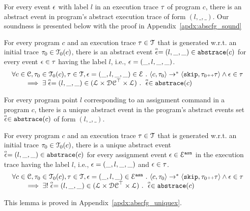    For every event $\mathtt{\epsilon}$ with label $l$ in an execution trace $\mathtt{\tau}$ of program $c$, 
   there is an abstract event in program's abstract execution trace of form $(l, \_, \_)$.  Our soundness is presented below
   with the proof in Appendix~\ref{apdx:abscfg_sound}
   \begin{lem}
     \label{lem:abscfg_sound}
     For every program $c$ and
     an execution trace $\mathtt{\tau} \in \mathcal{T}$ that is generated w.r.t.
     an initial trace  $\mathtt{\tau}_0 \in \mathcal{T}_0(c)$,
     there is an abstract event $\stackrel{\scriptscriptstyle{\alpha}}{\mathtt{\epsilon}{}} = (l, \_, \_) \in \mathtt{abs}{\mathtt{trace}}(c)$ 
     for every event $\mathtt{\epsilon} \in \mathtt{\tau}$ having the label $l$, i.e., $\mathtt{\epsilon} = (\_, l, \_, \_)$.
   \[
     \begin{array}{l}
       \forall c \in \mathcal{C}, \mathtt{\tau}_0 \in \mathcal{T}_0(c), \mathtt{\tau} \in \mathcal{T} ,  \mathtt{\epsilon} = (\_, l, \_, \_) \in \mathcal{E} ~.~
   \langle {c}, \mathtt{\tau}_0 \rangle \to^{*} \langle \mathtt{skip}, \mathtt{\tau}_0 {\scriptscriptstyle ++} \mathtt{\tau} \rangle 
   \land \mathtt{\epsilon} \in \mathtt{\tau} 
   \\
   \qquad \implies \exists \stackrel{\scriptscriptstyle{\alpha}}{\mathtt{\epsilon}{}} = (l, \_, \_) \in (\mathcal{L}\times \mathcal{DC}^{\top} \times \mathcal{L}) ~.~ 
   \stackrel{\scriptscriptstyle{\alpha}}{\mathtt{\epsilon}{}} \in \mathtt{abs}{\mathtt{trace}}(c)
   \end{array}
   \]
   \end{lem}

For every program point $l$ corresponding to an assignment command in a program $c$,
there is a unique abstract event in the program's abstract events set $\stackrel{\scriptscriptstyle{\alpha}}{\mathtt{\epsilon}{}} \in \mathtt{abs}{\mathtt{trace}}(c)$ of form $(l, \_, \_)$. 
\begin{lem}
  \label{lem:abscfg_uniquex}
  For every program $c$ and
  an execution trace $\mathtt{\tau} \in \mathcal{T}$ that is generated w.r.t.
  an initial trace  $\mathtt{\tau}_0 \in \mathcal{T}_0(c)$,
  there is a unique abstract event $\stackrel{\scriptscriptstyle{\alpha}}{\mathtt{\epsilon}{}} = (l, \_, \_) \in \mathtt{abs}{\mathtt{trace}}(c)$ 
  for every assignment event $\mathtt{\epsilon} \in \mathcal{E}^{\mathtt{{asn}}}$ in the
  execution trace having the label $l$, i.e., $\mathtt{\epsilon} = (\_, l, \_, \_)$ and  $\mathtt{\epsilon} \in \mathtt{\tau}$.
%
\[
  \begin{array}{l}
    \forall c \in \mathcal{C}, \mathtt{\tau}_0 \in \mathcal{T}_0(c), \mathtt{\tau} \in \mathcal{T} ,  \mathtt{\epsilon} = (\_, l, \_) \in \mathcal{E}^{\mathtt{{asn}}} ~.~
\langle {c}, \mathtt{\tau}_0 \rangle \to^{*} \langle \mathtt{skip}, \mathtt{\tau}_0 {\scriptscriptstyle ++} \mathtt{\tau} \rangle 
\land \mathtt{\epsilon} \in \mathtt{\tau} 
\\
\qquad \implies \exists! \stackrel{\scriptscriptstyle{\alpha}}{\mathtt{\epsilon}{}} = (l, \_, \_) \in (\mathcal{L}\times \mathcal{DC}^{\top} \times \mathcal{L}) ~.~ 
\stackrel{\scriptscriptstyle{\alpha}}{\mathtt{\epsilon}{}} \in \mathtt{abs}{\mathtt{trace}}(c)
\end{array}
\]
\end{lem}
This lemma is proved in Appendix~\ref{apdx:abscfg_uniquex}.

